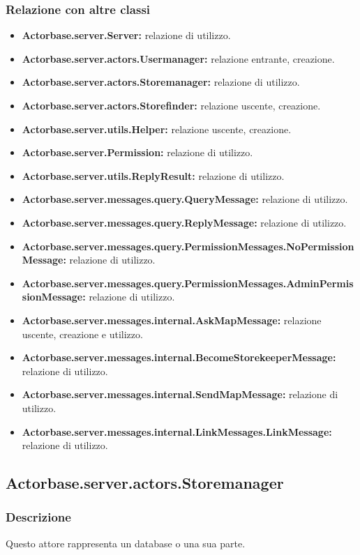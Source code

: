 \documentclass[a4paper]{article}
\begin{document}
			\subsubsection{Relazione con altre classi}
				\begin{itemize}
					\item \textbf{Actorbase.server.Server:} relazione di utilizzo.
					\item \textbf{Actorbase.server.actors.Usermanager:} relazione entrante, creazione.
					\item \textbf{Actorbase.server.actors.Storemanager:} relazione di utilizzo.
					\item \textbf{Actorbase.server.actors.Storefinder:} relazione uscente, creazione.
					\item \textbf{Actorbase.server.utils.Helper:} relazione uscente, creazione.
					\item \textbf{Actorbase.server.Permission:} relazione di utilizzo.
					\item \textbf{Actorbase.server.utils.ReplyResult:} relazione di utilizzo.
					\item \textbf{Actorbase.server.messages.query.QueryMessage:} relazione di utilizzo.
					\item \textbf{Actorbase.server.messages.query.ReplyMessage:} relazione di utilizzo.
					\item \textbf{Actorbase.server.messages.query.PermissionMessages.NoPermissionMessage:} relazione di utilizzo.
					\item \textbf{Actorbase.server.messages.query.PermissionMessages.AdminPermissionMessage:} relazione di utilizzo.
					\item \textbf{Actorbase.server.messages.internal.AskMapMessage:} relazione uscente, creazione e utilizzo.
					\item \textbf{Actorbase.server.messages.internal.BecomeStorekeeperMessage:} relazione di utilizzo.
					\item \textbf{Actorbase.server.messages.internal.SendMapMessage:} relazione di utilizzo.
					\item \textbf{Actorbase.server.messages.internal.LinkMessages.LinkMessage:} relazione di utilizzo.
				\end{itemize}
				
		\subsection{Actorbase.server.actors.Storemanager}
			\subsubsection{Descrizione}
				Questo attore rappresenta un database o una sua parte.
				
\end{document}
